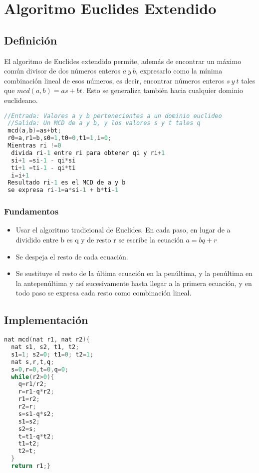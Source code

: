 \chapter{Algoritmo Euclides Extendido}
\section{Definición}
El algoritmo de Euclides extendido permite, además de encontrar un máximo común divisor de dos números enteros  $a\: y\: b$, expresarlo como la mínima combinación lineal de esos números, es decir, encontrar números enteros $s\: y\: t$ tales que $mcd(a,b)=as+bt$. Esto se generaliza también hacia cualquier dominio euclideano. 
\begin{lstlisting}[language=C++]
 //Entrada: Valores a y b pertenecientes a un dominio euclideo
 //Salida: Un MCD de a y b, y los valores s y t tales q 
 mcd(a,b)=as+bt;
 r0=a,r1=b,s0=1,t0=0,t1=1,i=0;
 Mientras ri !=0
  divida ri-1 entre ri para obtener qi y ri+1
  si+1 =si-1 - qi*si
  ti+1 =ti-1 - qi*ti
  i=i+1
 Resultado ri-1 es el MCD de a y b
 se expresa ri-1=a*si-1 + b*ti-1
\end{lstlisting}
\subsection{Fundamentos}
\begin{itemize}
 \item Usar el algoritmo tradicional de Euclides. En cada paso, en lugar de a dividido entre b es q y de resto r se escribe la ecuación $a = b q + r$
 \item Se despeja el resto de cada ecuación.
 \item Se sustituye el resto de la última ecuación en la penúltima, y la penúltima en la antepenúltima y así sucesivamente hasta llegar a la primera ecuación, y en todo paso se expresa cada resto como combinación lineal.
\end{itemize}
\section{Implementación}
\begin{lstlisting}[language=C++]
nat mcd(nat r1, nat r2){
  nat s1, s2, t1, t2;
  s1=1; s2=0; t1=0; t2=1;
  nat s,r,t,q;
  s=0,r=0,t=0,q=0;
  while(r2>0){
    q=r1/r2;
    r=r1-q*r2;
    r1=r2;                                                           
    r2=r;                                                            
    s=s1-q*s2;                                                       
    s1=s2;                                                           
    s2=s;                                                            
    t=t1-q*t2;                                                       
    t1=t2;                                                           
    t2=t;                                                            
  }
  return r1;} 
\end{lstlisting}
